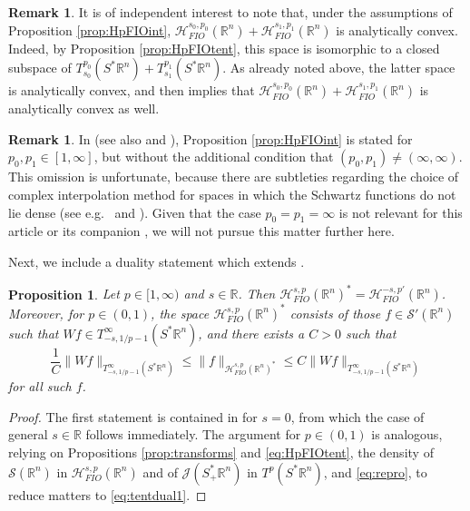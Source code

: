 \documentclass{amsart}
\newcommand {\HT}{\mathcal{H}}
\newcommand {\Hps}{\mathcal{H}^{s,p}_{FIO}(\Rn)}
\newcommand {\J}{\mathcal{J}}
\newcommand {\R}{\mathbb R}
\newcommand {\Rn}{\mathbb{R}^{n}}
\newcommand {\Sp}{S^{*}\Rn}
\newcommand {\Spp}{S^{*}_{+}\Rn}
\newcommand {\Sw}{\mathcal{S}}
\newtheorem{proposition}[theorem]{Proposition}
\theoremstyle{definition}
\newtheorem{remark}[theorem]{Remark}
\numberwithin{equation}{section}
\begin{document}
\begin{remark}\label{rem:HpFIOanconvex}
It is of independent interest to note that, under the assumptions of Proposition \ref{prop:HpFIOint}, $\HT^{s_{0},p_{0}}_{FIO}(\Rn)+\HT^{s_{1},p_{1}}_{FIO}(\Rn)$ is analytically convex. Indeed, by Proposition \ref{prop:HpFIOtent}, this space is isomorphic to a closed subspace of $T^{p_{0}}_{s_{0}}(\Sp)+T^{p_{1}}_{s_{1}}(\Sp)$. As already noted above, the latter space is analytically convex, and then \cite[Lemma 7.5]{KaMaMi07} implies that $\HT^{s_{0},p_{0}}_{FIO}(\Rn)+ \HT^{s_{1},p_{1}}_{FIO}(\Rn)$ is analytically convex as well.
\end{remark}

\begin{remark}\label{rem:interinfty}
In \cite[Corollary 3.5]{Hassell-Rozendaal23} (see also \cite[page 7]{Rozendaal22} and \cite[equation (2.3) and Remark 4.12]{LiRoSoYa24}), Proposition \ref{prop:HpFIOint} is stated for $p_{0},p_{1}\in[1,\infty]$, but without the additional condition that $(p_{0},p_{1})\neq (\infty,\infty)$. This omission is unfortunate, because there are subtleties regarding the choice of complex interpolation method for spaces in which the Schwartz functions do not lie dense (see e.g.~\cite[Section 2.4.7]{Triebel10} and \cite[Section 13.A]{Taylor23c}). Given that the case $p_{0}=p_{1}=\infty$ is not relevant for this article or its companion \cite{LiRoSo25a}, we will not pursue this matter further here.
\end{remark}

Next, we include a duality statement which extends \cite[Proposition 6.8]{HaPoRo20}. 

\begin{proposition}\label{prop:HpFIOdual}
Let $p\in[1,\infty)$ and $s\in\R$. Then $\Hps^{*}=\HT^{-s,p'}_{FIO}(\Rn)$. 
Moreover, for $p\in(0,1)$, the space $\Hps^{*}$ consists of those $f\in\Sw'(\Rn)$ such that $Wf\in T^{\infty}_{-s,1/p-1}(\Sp)$, and there exists a $C>0$ such that 
\[
\frac{1}{C}\|Wf\|_{T^{\infty}_{-s,1/p-1}(\Sp)}\leq \|f\|_{\Hps^{*}}\leq C\|Wf\|_{T^{\infty}_{-s,1/p-1}(\Sp)}
\]
for all such $f$.
\end{proposition}
\begin{proof}
The first statement is contained in \cite[Proposition 6.8]{HaPoRo20} for $s=0$, from which the case of general $s\in\R$ follows immediately. %
The argument for $p\in(0,1)$ is analogous, relying on Propositions \ref{prop:transforms} and \ref{eq:HpFIOtent}, the density of $\Sw(\Rn)$ in $\Hps$ and of $\J(\Spp)$ in $T^{p}(\Sp)$, and \eqref{eq:repro}, to reduce matters to %
\eqref{eq:tentdual1}. 
\end{proof}
\end{document}
